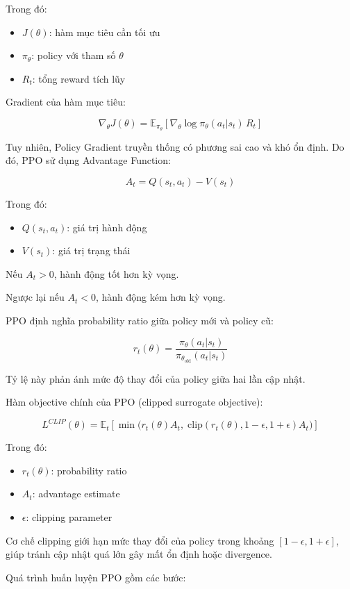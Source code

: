 Trong đó:
\begin{itemize}
    \item $J(\theta)$: hàm mục tiêu cần tối ưu
    \item $\pi_\theta$: policy với tham số $\theta$
    \item $R_t$: tổng reward tích lũy
\end{itemize}

Gradient của hàm mục tiêu:

\[
\nabla_\theta J(\theta)
= \mathbb{E}_{\pi_\theta}\left[\nabla_\theta \log \pi_\theta(a_t|s_t)\, R_t \right]
\]

Tuy nhiên, Policy Gradient truyền thống có phương sai cao và khó ổn định. Do đó, PPO sử dụng Advantage Function:

\[
A_t = Q(s_t, a_t) - V(s_t)
\]

Trong đó:
\begin{itemize}
    \item $Q(s_t, a_t)$: giá trị hành động
    \item $V(s_t)$: giá trị trạng thái
\end{itemize}

Nếu $A_t > 0$, hành động tốt hơn kỳ vọng.

Ngược lại nếu $A_t < 0$, hành động kém hơn kỳ vọng.

PPO định nghĩa probability ratio giữa policy mới và policy cũ:

\[
r_t(\theta) =
\frac{\pi_\theta(a_t|s_t)}{\pi_{\theta_{\text{old}}}(a_t|s_t)}
\]

Tỷ lệ này phản ánh mức độ thay đổi của policy giữa hai lần cập nhật.

Hàm objective chính của PPO (clipped surrogate objective):

\[
L^{CLIP}(\theta)
=
\mathbb{E}_t \left[
\min \Big(
r_t(\theta) A_t,\;
\text{clip}(r_t(\theta), 1-\epsilon, 1+\epsilon) A_t
\Big)
\right]
\]

Trong đó:
\begin{itemize}
    \item $r_t(\theta)$: probability ratio
    \item $A_t$: advantage estimate
    \item $\epsilon$: clipping parameter
\end{itemize}

Cơ chế clipping giới hạn mức thay đổi của policy trong khoảng $[1-\epsilon, 1+\epsilon]$, giúp tránh cập nhật quá lớn gây mất ổn định hoặc divergence.

Quá trình huấn luyện PPO gồm các bước:

